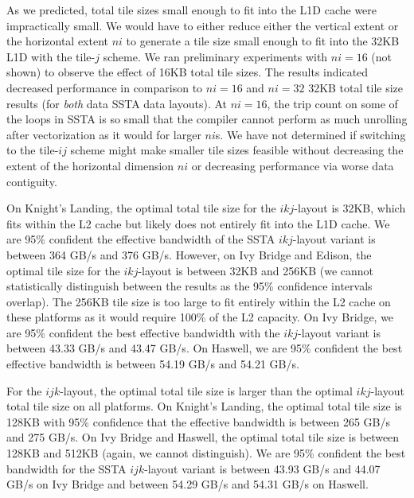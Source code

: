 \documentclass{sig-alternate-05-2015}
\begin{document}
As we predicted, total tile sizes small enough to fit into the L1D cache were
  impractically small.
We would have to either reduce either the vertical extent or the horizontal
  extent \(ni\) to generate a tile size small enough to fit into the 32KB L1D
  with the tile-\(j\) scheme.
We ran preliminary experiments with \(ni=16\) (not shown) to observe the effect
  of 16KB total tile sizes.
The results indicated decreased performance in comparison to \(ni=16\) and
  \(ni=32\) 32KB total tile size results (for \emph{both} data SSTA data layouts).
At \(ni=16\), the trip count on some of the loops in SSTA is so small that the
  compiler cannot perform as much unrolling after vectorization as it would for
  larger \(ni\)s.
We have not determined if switching to the tile-\(ij\) scheme might make
  smaller tile sizes feasible without decreasing the extent of the horizontal
  dimension \(ni\) or decreasing performance via worse data contiguity.

On Knight's Landing, the optimal total tile size for the \(ikj\)-layout is 32KB,
  which fits within the L2 cache but likely does not entirely fit into the L1D
  cache.
We are 95\% confident the effective bandwidth of the SSTA \(ikj\)-layout variant
  is between 364 GB/s and 376 GB/s.
However, on Ivy Bridge and Edison, the optimal tile size for the \(ikj\)-layout
  is between 32KB and 256KB (we cannot statistically distinguish between the results
  as the 95\% confidence intervals overlap).
The 256KB tile size is too large to fit entirely within the L2 cache on these
  platforms as it would require 100\% of the L2 capacity.
On Ivy Bridge, we are 95\% confident the best effective bandwidth with the \(ikj\)-layout variant is 
  between 43.33 GB/s and 43.47 GB/s.
On Haswell, we are 95\% confident the best effective bandwidth is 
  between 54.19 GB/s and 54.21 GB/s.

For the \(ijk\)-layout, the optimal total tile size is larger than the optimal
  \(ikj\)-layout total tile size on all platforms.
On Knight's Landing, the optimal total tile size is 128KB with 95\% confidence that
  the effective bandwidth is between 265 GB/s and 275 GB/s.
On Ivy Bridge and Haswell, the optimal total tile size is between 128KB and 512KB
  (again, we cannot distinguish).
We are 95\% confident the best bandwidth for the SSTA \(ijk\)-layout variant is
  between 43.93 GB/s and 44.07 GB/s on Ivy Bridge and between 54.29 GB/s and
  54.31 GB/s on Haswell.
\end{document}
